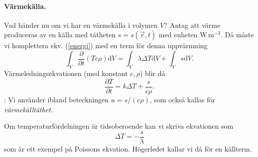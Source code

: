 \documentclass[%
oneside,                 %
final,                   %
10pt]{article}
\newcommand{\shortinlinecomment}[3]{{\color{red}{\bf #1}: #2}}
\begin{document}
\paragraph{Värmekälla.}
Vad händer nu om vi har en värmekälla i volymen $V$?  Antag att värme
produceras av en källa med tätheten $s = s(\vec{r},t)$ med enheten W\,m$^{-3}$.
Då måste vi komplettera ekv. (\ref{energi}) med en term för denna
uppvärmning
\begin{equation}
  \int_{V} \frac{\partial}{\partial t} \left( Tc\rho \right) \mbox{d}V = \int_{V} \lambda 
\Delta  T
\mbox{d}V + \int_{V} s \mbox{d}V.
\end{equation}
Värmeledningsekvationen (med konstant $c,\rho$) blir då
\begin{equation}
  \frac{\partial T}{\partial t} = k \Delta T + \frac{s}{c\rho}.
\end{equation}
\shortinlinecomment{Kommentar 1}{ Vi använder ibland beteckningen $u = s/(c\rho)$, som också kallas för \emph{värmekälltäthet}. }{ Vi använder ibland beteckningen }

Om temperaturfördelningen är tidsoberoende kan vi skriva ekvationen som
\begin{equation}
  \Delta  T = -\frac{s}{\lambda}
\end{equation}
som är ett exempel på Poissons ekvation.
Högerledet kallar vi då för en källterm.
\end{document}
